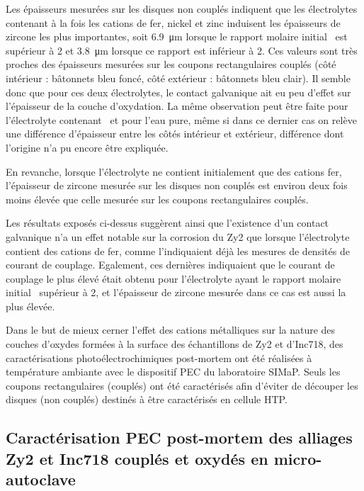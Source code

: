 \begin{refsection}
    Les épaisseurs mesurées sur les disques non couplés indiquent que
    les électrolytes contenant à la fois les cations de fer, nickel et
    zinc induisent les épaisseurs de zircone les plus importantes,
    soit \SI{6.9}{\micro\meter} lorsque le rapport molaire initial \ratio\ est
    supérieur à 2 et \SI{3.8}{\micro\meter} lorsque ce rapport est inférieur à 2.
    Ces valeurs sont très proches des épaisseurs mesurées sur les coupons
    rectangulaires couplés (côté intérieur : bâtonnets bleu foncé, côté extérieur : bâtonnets bleu clair).
    Il semble donc que pour ces deux électrolytes, le contact galvanique
    ait eu peu d’effet sur l’épaisseur de la couche d’oxydation. La même observation peut
    être faite pour l’électrolyte contenant \NaSO\, et pour l’eau pure, même si dans 
    ce dernier cas on relève une différence d’épaisseur entre les côtés intérieur et extérieur,
    différence dont l’origine n’a pu encore être expliquée.

    En revanche, lorsque l’électrolyte ne contient initialement que des cations fer,
    l’épaisseur de zircone mesurée sur les disques non couplés est environ deux fois
    moins élevée que celle mesurée sur les coupons rectangulaires couplés.
    
    Les résultats exposés ci-dessus suggèrent ainsi que l’existence d’un contact 
    galvanique n’a un effet notable sur la corrosion du Zy2 que lorsque l’électrolyte
    contient des cations de fer, comme l’indiquaient déjà les mesures de densités de
    courant de couplage. Egalement, ces dernières indiquaient que le courant de couplage
    le plus élevé était obtenu pour l’électrolyte ayant le rapport molaire initial
    \ratio\ supérieur à 2, et l’épaisseur de zircone mesurée dans
    ce cas est aussi la plus élevée. 
    
    Dans le but de mieux cerner l’effet des cations métalliques sur
    la nature des couches d’oxydes formées à la surface des échantillons
    de Zy2 et d’Inc718, des caractérisations photoélectrochimiques post-mortem
    ont été réalisées à température ambiante avec le dispositif PEC du laboratoire
    SIMaP. Seuls les coupons rectangulaires (couplés) ont été caractérisés afin d’éviter
    de découper les disques (non couplés) destinés à être caractérisés en cellule HTP.
    

    \subsection{Caractérisation PEC post-mortem des alliages Zy2 et Inc718 couplés et oxydés en
    micro-autoclave}\label{subsec:post_mortem_PEC}


\end{refsection}
